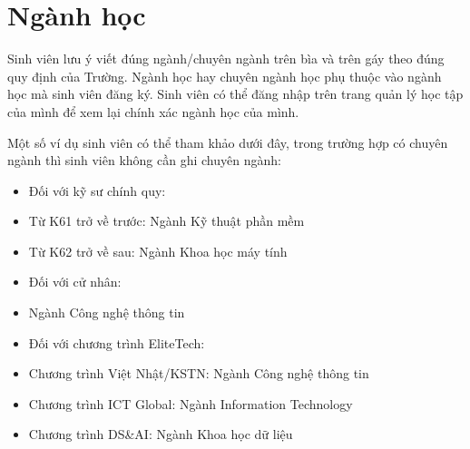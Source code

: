 \documentclass[../DoAn.tex]{subfiles}
\begin{document}
\section{Ngành học}
Sinh viên lưu ý viết đúng ngành/chuyên ngành trên bìa và trên gáy theo đúng quy định của Trường. Ngành học hay chuyên ngành học phụ thuộc vào ngành học mà sinh viên đăng ký. Sinh viên có thể đăng nhập trên trang quản lý học tập của mình để xem lại chính xác ngành học của mình.

Một số ví dụ sinh viên có thể tham khảo dưới đây, trong trường hợp có chuyên ngành thì sinh viên không cần ghi chuyên ngành:

\begin{itemize}
  \item Đối với kỹ sư chính quy:
  \item Từ K61 trở về trước: Ngành Kỹ thuật phần mềm
  \item Từ K62 trở về sau: Ngành Khoa học máy tính
  \item Đối với cử nhân:
  \item Ngành Công nghệ thông tin
  \item Đối với chương trình EliteTech:
  \item Chương trình Việt Nhật/KSTN: Ngành Công nghệ thông tin
  \item Chương trình ICT Global: Ngành Information Technology
  \item Chương trình DS\&AI: Ngành Khoa học dữ liệu
\end{itemize}
\end{document}
